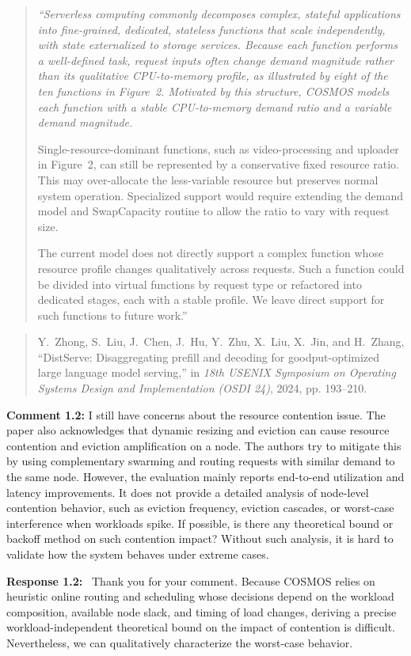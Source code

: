 \documentclass[11pt]{article}
\newcommand{\sysname}{COSMOS\xspace}
\newcommand{\response}[1]{\par\medskip\noindent\textbf{Response #1:}\ }
\newenvironment{revisionquote}{\begin{quote}\itshape}{\end{quote}}
\begin{document}
\begin{revisionquote}
``Serverless computing commonly decomposes complex, stateful applications into fine-grained, dedicated, stateless functions that scale independently, with state externalized to storage services. Because each function performs a well-defined task, request inputs often change demand magnitude rather than its qualitative CPU-to-memory profile, as illustrated by eight of the ten functions in Figure~2. Motivated by this structure, COSMOS models each function with a stable CPU-to-memory demand ratio and a variable demand magnitude.

Single-resource-dominant functions, such as video-processing and uploader in Figure~2, can still be represented by a conservative fixed resource ratio. This may over-allocate the less-variable resource but preserves normal system operation. Specialized support would require extending the demand model and SwapCapacity routine to allow the ratio to vary with request size.

The current model does not directly support a complex function whose resource profile changes qualitatively across requests. Such a function could be divided into virtual functions by request type or refactored into dedicated stages, each with a stable profile. We leave direct support for such functions to future work.''
\end{revisionquote}

\begin{quote}\small
Y.~Zhong, S.~Liu, J.~Chen, J.~Hu, Y.~Zhu, X.~Liu, X.~Jin, and H.~Zhang, ``DistServe: Disaggregating prefill and decoding for goodput-optimized large language model serving,'' in \emph{18th USENIX Symposium on Operating Systems Design and Implementation (OSDI 24)}, 2024, pp. 193--210.
\end{quote}

\begin{reviewcomment}
\textbf{Comment 1.2:} I still have concerns about the resource contention issue. The paper also acknowledges that dynamic resizing and eviction can cause resource contention and eviction amplification on a node. The authors try to mitigate this by using complementary swarming and routing requests with similar demand to the same node. However, the evaluation mainly reports end-to-end utilization and latency improvements. It does not provide a detailed analysis of node-level contention behavior, such as eviction frequency, eviction cascades, or worst-case interference when workloads spike. If possible, is there any theoretical bound or backoff method on such contention impact? Without such analysis, it is hard to validate how the system behaves under extreme cases.
\end{reviewcomment}
\response{1.2} Thank you for your comment. Because \sysname relies on heuristic online routing and scheduling whose decisions depend on the workload composition, available node slack, and timing of load changes, deriving a precise workload-independent theoretical bound on the impact of contention is difficult. Nevertheless, we can qualitatively characterize the worst-case behavior.
\end{document}

